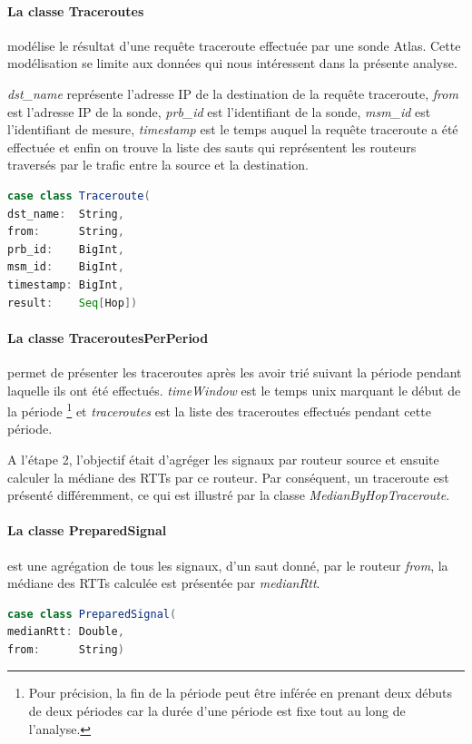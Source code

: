 \paragraph{La classe Traceroutes} modélise le résultat d'une requête traceroute effectuée par une sonde Atlas. Cette modélisation se limite aux données qui nous intéressent dans la présente analyse. 

\textit{dst\_name} représente l'adresse IP de la destination de la requête traceroute, \textit{from} est l'adresse IP de la sonde, \textit{prb\_id} est l'identifiant de la sonde, \textit{msm\_id} est l'identifiant de mesure, \textit{timestamp} est le temps auquel la requête traceroute a été effectuée et enfin on trouve la liste des sauts qui représentent les routeurs traversés par le trafic entre la source et la destination. 

\begin{lstlisting}[language=scala]
case class Traceroute(
dst_name:  String,
from:      String,
prb_id:    BigInt,
msm_id:    BigInt,
timestamp: BigInt,
result:    Seq[Hop])
\end{lstlisting}
\paragraph{La classe TraceroutesPerPeriod} permet de présenter les traceroutes après les avoir trié   suivant la période pendant laquelle ils ont été effectués.   \textit{timeWindow} est le temps unix marquant le début de la période \footnote{Pour précision, la fin de la période peut être inférée en prenant deux débuts de deux périodes car la durée d'une période est fixe tout au long de l'analyse.} et  \textit{traceroutes} est la liste des traceroutes effectués pendant cette période. 


A l'étape 2, l'objectif était d'agréger  les signaux par routeur source et ensuite calculer la médiane des RTTs par ce routeur. Par conséquent, un traceroute est présenté différemment, ce qui est  illustré par la classe \textit{MedianByHopTraceroute}.

\paragraph{La classe PreparedSignal }  est une agrégation de tous les signaux, d'un saut donné, par le routeur \textit{from},  la médiane des RTTs calculée est présentée par \textit{medianRtt}.
\begin{lstlisting}[language=scala]
case class PreparedSignal(
medianRtt: Double,
from:      String)
\end{lstlisting}
